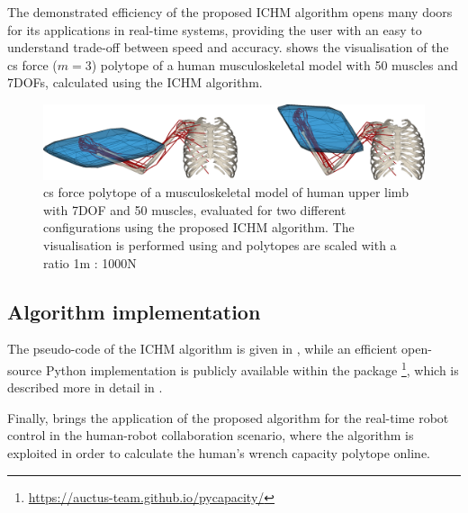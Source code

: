 The demonstrated efficiency of the proposed ICHM algorithm opens many doors for its applications in real-time systems, providing the user with an easy to understand trade-off between speed and accuracy. 
 shows the visualisation of the \gls{cs} force ($m=3$) polytope of a human musculoskeletal model with 50 muscles and 7DOFs, calculated using the ICHM algorithm.


\begin{figure}[!t]
    \centering
    \includegraphics[width=\linewidth]{Papers/images/force.png}
    \caption{\gls{cs} force polytope of a musculoskeletal model of human upper limb  \cite{saul2015benchmarking} with 7DOF and 50 muscles, evaluated for two different configurations using the proposed ICHM algorithm. The visualisation is performed using  \cite{Michaud2021} and polytopes are scaled with a ratio 1m : 1000N}
    \label{fig:images_bimanual}
\end{figure}

\subsection{Algorithm implementation}
The pseudo-code of the ICHM algorithm is given in , while an efficient open-source Python implementation is publicly available within the package \footnote{\href{https://auctus-team.github.io/pycapacity/}{https://auctus-team.github.io/pycapacity/}}, which is described more in detail in .

Finally,  brings the application of the proposed algorithm for the real-time robot control in the human-robot collaboration scenario, where the algorithm is exploited in order to calculate the human's wrench capacity polytope online. 



